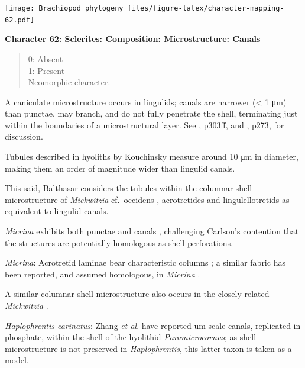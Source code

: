 \documentclass[]{book}
\theoremstyle{definition}
\theoremstyle{definition}
\theoremstyle{definition}
\theoremstyle{remark}
\begin{document}
\texttt{[image: Brachiopod\_phylogeny\_files/figure-latex/character-mapping-62.pdf]}

\textbf{Character 62: Sclerites: Composition: Microstructure: Canals}

\begin{quote}
0: Absent\\
1: Present\\
Neomorphic character.
\end{quote}

A caniculate microstructure occurs in lingulids; canals are narrower
(\textless{} 1 μm) than punctae, may branch, and do not fully penetrate
the shell, terminating just within the boundaries of a microstructural
layer. See \citet{Williams1997BrachiopodaRevised}, p303ff, and
\citet{Balthasar2008iMummpikia}, p273, for discussion.

Tubules described in hyoliths by Kouchinsky
\citeyearpar{Kouchinsky2000Skeletalmicrostructures} measure around 10 μm
in diameter, making them an order of magnitude wider than lingulid
canals.

This said, Balthasar \citeyearpar{Balthasar2008iMummpikia} considers the
tubules within the columnar shell microstructure of \emph{Mickwitzia}
cf.~occidens \citep[1--3 μm wide,][]{Skovsted2003EarlyCambrian},
acrotretides \citep[1 μm wide,
see][\citet{Zhang2016Epithelialcell}]{Holmer1989MiddleOrdovician} and
lingulellotretids \citep[100 nm wide,][]{Cusack1999Chemicostructural} as
equivalent to lingulid canals.

\emph{Micrina} exhibits both punctae and canals
\citep{Harper2017Brachiopodsorigin}, challenging Carlson's contention
\citep[in][]{Williams2007PartH} that the structures are potentially
homologous as shell perforations.

\emph{Micrina}: Acrotretid laminae bear characteristic columns
\citep[e.g.][]{Zhang2016Epithelialcell}; a similar fabric has been
reported, and assumed homologous, in \emph{Micrina}
\citep{Butler2012ConstructingCambrian}.

A similar columnar shell microstructure also occurs in the closely
related \emph{Mickwitzia} \citep{Balthasar2008iMummpikia}.

\emph{Haplophrentis carinatus}: Zhang \emph{et al}.
\citeyearpar{Zhang2018Ahyolithid} have reported um-scale canals,
replicated in phosphate, within the shell of the hyolithid
\emph{Paramicrocornus}; as shell microstructure is not preserved in
\emph{Haplophrentis}, this latter taxon is taken as a model.
\end{document}
